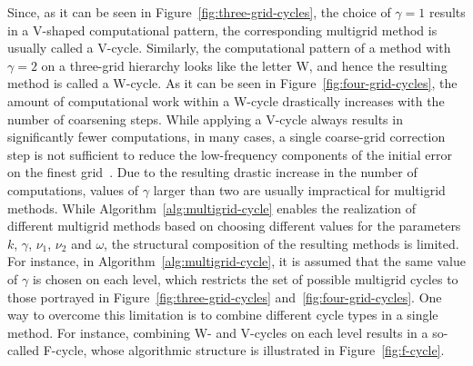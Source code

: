 Since, as it can be seen in Figure~\ref{fig:three-grid-cycles}, the choice of $\gamma = 1$ results in a V-shaped computational pattern, the corresponding multigrid method is usually called a V-cycle.
Similarly, the computational pattern of a method with $\gamma = 2$ on a three-grid hierarchy looks like the letter W, and hence the resulting method is called a W-cycle.
As it can be seen in Figure~\ref{fig:four-grid-cycles}, the amount of computational work within a W-cycle drastically increases with the number of coarsening steps.
While applying a V-cycle always results in significantly fewer computations, in many cases, a single coarse-grid correction step is not sufficient to reduce the low-frequency components of the initial error on the finest grid~\cite{trottenberg2000multigrid}.
Due to the resulting drastic increase in the number of computations, values of $\gamma$ larger than two are usually impractical for multigrid methods.
While Algorithm~\ref{alg:multigrid-cycle} enables the realization of different multigrid methods based on choosing different values for the parameters $k$, $\gamma$, $\nu_1$, $\nu_2$ and $\omega$, the structural composition of the resulting methods is limited.
For instance, in Algorithm~\ref{alg:multigrid-cycle}, it is assumed that the same value of $\gamma$ is chosen on each level, which restricts the set of possible multigrid cycles to those portrayed in Figure~\ref{fig:three-grid-cycles} and~\ref{fig:four-grid-cycles}.
One way to overcome this limitation is to combine different cycle types in a single method.
For instance, combining W- and V-cycles on each level results in a so-called F-cycle, whose algorithmic structure is illustrated in Figure~\ref{fig:f-cycle}.
